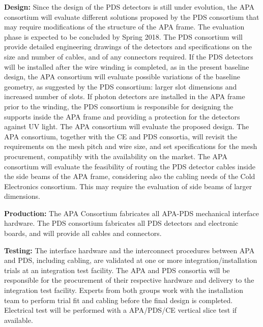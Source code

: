 \textbf{Design:}
Since the design of the PDS detectors is still under evolution, the APA consortium will evaluate different solutions proposed by the PDS consortium that may require modifications of the structure of the APA frame. The evaluation phase is expected to be concluded by Spring 2018. The PDS consortium will provide detailed engineering drawings of the detectors and specifications on the size and number of cables, and of any connectors required. 
If the PDS detectors will be installed after the wire winding is completed, as in the present baseline design, the APA consortium will evaluate possible variations of the baseline geometry, as suggested by the PDS consortium: larger slot dimensions and increased number of slots.
If photon detectors are installed in the APA frame prior to the winding, the PDS consortium is responsible for designing the supports inside the APA frame and providing a protection for the detectors against UV light. The APA consortium will evaluate the proposed design.
The APA consortium, together with the CE and PDS consortia, will revisit the requirements on the mesh pitch and wire size, and set specifications for the mesh procurement, compatibly with the availability on the market.
The APA consortium will evaluate the feasibility of routing the PDS detector cables inside the side beams of the APA frame, considering also the cabling needs of the Cold Electronics consortium. This may require the evaluation of side beams of larger dimensions.

\textbf{Production:}
The APA Consortium fabricates all APA-PDS mechanical interface hardware.
The PDS consortium fabricates all PDS detectors and electronic boards, and will provide all cables and connectors.

\textbf{Testing:}
The interface hardware and the interconnect procedures between APA and PDS, including cabling, are validated at one or more integration/installation trials at an integration test facility. The APA and PDS consortia will be responsible for the procurement of their respective hardware and delivery to the integration test facility. Experts from both groups work with the installation team to perform trial fit and cabling before the final design is completed.  Electrical test will be performed with a APA/PDS/CE vertical slice test if available.


